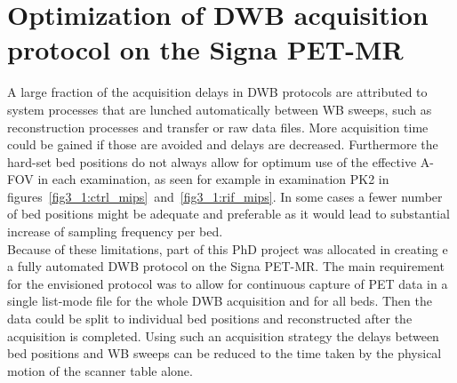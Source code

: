 \section{Optimization of DWB acquisition protocol on the Signa PET-MR}
A large fraction of the acquisition delays in DWB protocols are attributed to system processes that are lunched automatically between WB sweeps, such as reconstruction processes and transfer or raw data files. More acquisition time could be gained if those are avoided and delays are decreased. Furthermore the hard-set bed positions do not always allow for optimum use of the effective A-FOV in each examination, as seen for example in examination PK2 in figures~\ref{fig3_1:ctrl_mips}~and~\ref{fig3_1:rif_mips}. In some cases a fewer number of bed positions might be adequate and preferable as it would lead to substantial increase of sampling frequency per bed. \\
Because of these limitations, part of this PhD project was allocated in creating e a fully automated DWB protocol on the Signa PET-MR. The main requirement for the envisioned protocol was to allow for continuous capture of PET data in a single list-mode file for the whole DWB acquisition and for all beds. Then the data could be split to individual bed positions and reconstructed after the acquisition is completed. Using such an acquisition strategy the delays between bed positions and WB sweeps can be reduced to the time taken by the physical motion of the scanner table alone. \\

